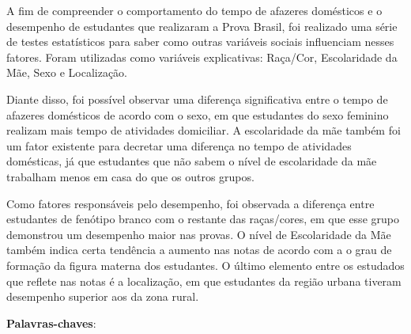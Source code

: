 
\setlength{\absparsep}{18pt} %
\begin{resumo}  
    

  A fim de compreender o comportamento do tempo de afazeres domésticos e o desempenho de
  estudantes que realizaram a Prova Brasil, foi realizado uma série de testes estatísticos para saber como 
  outras variáveis sociais influenciam nesses fatores. Foram utilizadas como variáveis explicativas: Raça/Cor,
  Escolaridade da Mãe, Sexo e Localização.
 
  Diante disso, foi possível observar uma diferença significativa entre o tempo de afazeres domésticos de acordo com o sexo,
  em que estudantes do sexo feminino realizam mais tempo de atividades domiciliar. A escolaridade da mãe também foi um fator existente
  para decretar uma diferença no tempo de atividades domésticas, já que estudantes que não sabem o nível de escolaridade da mãe 
  trabalham menos em casa do que os outros grupos.
 
  Como fatores responsáveis pelo desempenho, foi observada a diferença entre estudantes de fenótipo branco com o restante
  das raças/cores, em que esse grupo demonstrou um desempenho maior nas provas. O nível de Escolaridade da Mãe também indica 
  certa tendência a aumento nas notas de acordo com a o grau de formação da figura materna dos estudantes. O último 
  elemento entre os estudados que reflete nas notas é a localização, em que estudantes da região urbana tiveram desempenho superior 
  aos da zona rural.
    
  \noindent
  \textbf{Palavras-chaves}: \kwords
\end{resumo}
